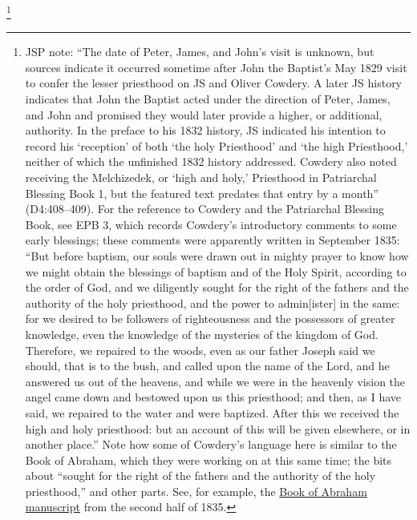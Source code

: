 				\footnote{%
					JSP note: ``The date of Peter, James, and John's visit is unknown, but sources indicate it occurred sometime after John the Baptist's May 1829 visit to confer the lesser priesthood on JS and Oliver Cowdery. A later JS history indicates that John the Baptist acted under the direction of Peter, James, and John and promised they would later provide a higher, or additional, authority. In the preface to his 1832 history, JS indicated his intention to record his `reception' of both `the holy Priesthood' and `the high Priesthood,' neither of which the unfinished 1832 history addressed. Cowdery also noted receiving the Melchizedek, or `high and holy,' Priesthood in Patriarchal Blessing Book 1, but the featured text predates that entry by a month'' (D4:408--409). For the reference to Cowdery and the Patriarchal Blessing Book, see EPB 3, which records Cowdery's introductory comments to some early blessings; these comments were apparently written in September 1835: ``But before baptism, our souls were drawn out in mighty prayer to know how we might obtain the blessings of baptism and of the Holy Spirit, according to the order of God, and we diligently sought for the right of the fathers and the authority of the holy priesthood, and the power to admin[ister] in the same: for we desired to be followers of righteousness and the possessors of greater knowledge, even the knowledge of the mysteries of the kingdom of God. Therefore, we repaired to the woods, even as our father Joseph said we should, that is to the bush, and called upon the name of the Lord, and he answered us out of the heavens, and while we were in the heavenly vision the angel came down and bestowed upon us this priesthood; and then, as I have said, we repaired to the water and were baptized. After this we received the high and holy priesthood: but an account of this will be given elsewhere, or in another place.'' Note how some of Cowdery's language here is similar to the Book of Abraham, which they were working on at this same time; the bits about ``sought for the right of the fathers and the authority of the holy priesthood,'' and other parts. See, for example, the \hyperref[EMS-1835-JS-CIR-JUL-CIR-NOV-1835]{Book of Abraham manuscript} from the second half of 1835.
					}
			
